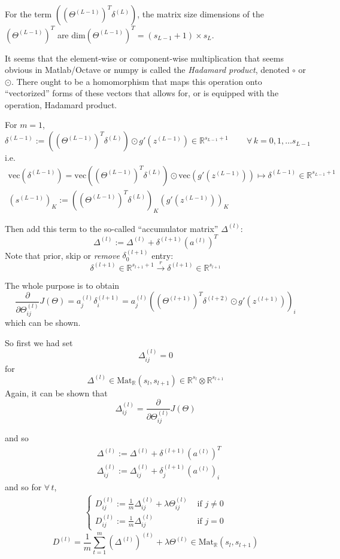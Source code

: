 \documentclass[10pt]{amsart}
\begin{document}
\begin{multicols*}{2}
For the term $((\Theta^{(L-1)})^T \delta^{(L)} )$, the matrix size dimensions of the $(\Theta^{(L-1)})^T$ are $\text{dim}( \Theta^{(L-1)} )^T = (s_{L-1}  + 1) \times s_L$.

It seems that the element-wise or component-wise multiplication that seems obvious in Matlab/Octave or numpy is called the \emph{Hadamard product}, denoted $\circ$ or $\odot$.  There ought to be a homomorphism that maps this operation onto ``vectorized'' forms of these vectors that allows for, or is equipped with the operation, Hadamard product.

For $m=1$,
\[
\delta^{(L-1)} := \left( ( \Theta^{(L-1)})^T \delta^{(L)} \right) \odot g'(z^{(L-1)}) \in \mathbb{R}^{s_{L-1} + 1} \qquad \, \forall \, k = 0 , 1, \dots s_{L-1}
\]
i.e.
\[
\begin{gathered}
  \text{vec}(\delta^{(L-1)} ) = \text{vec} ((\Theta^{(L-1)})^T \delta^{(L)} ) \odot \text{vec}( g'(z^{(L-1)}) ) \mapsto \delta^{(L-1)} \in \mathbb{R}^{s_{L-1} + 1} \\ 
 (s^{(L-1)} )_K := ((\Theta^{(L-1)})^T \delta^{(L)} )_K (g'(z^{(L-1)} ) )_K
\end{gathered}
\]

Then add this term to the so-called ``accumulator matrix'' $\Delta^{(l)}$:
\[
\Delta^{(l)} := \Delta^{(l)} + \delta^{(l+1)} (a^{(l)})^T
\]
Note that prior, skip or \emph{remove} $\delta_0^{(l+1)}$ entry:
\[
\delta^{(l+1)} \in \mathbb{R}^{ s_{l+1} + 1} \xrightarrow{ r} \delta^{(l+1)} \in \mathbb{R}^{s_{l+1} }
\]

The whole purpose is to obtain
\[
\frac{ \partial }{ \partial \Theta^{(l)}_{ij} } J(\Theta) = a_j^{(l)} \delta_i^{(l+1)} = a_j^{(l)} ( (\Theta^{(l+1)})^T \delta^{(l+2)} \odot g'(z^{(l+1)}) )_i  
\]
which can be shown.

So first we had set
\[
\Delta_{ij}^{(l)} = 0 
\]
for
\[
\Delta^{(l)} \in \text{Mat}_{\mathbb{R}}(s_l, s_{l+1} ) \in \mathbb{R}^{s_l} \otimes \mathbb{R}^{s_{l+1}} 
\]
Again, it can be shown that 
\begin{equation}
  \Delta_{ij}^{(l)} = \frac{ \partial }{ \partial \Theta^{(l)}_{ij} } J(\Theta)
  \end{equation}

and so
\[
\begin{aligned}
 & \Delta^{(l)} := \Delta^{(l)} + \delta^{(l+1)} (a^{(l)})^T \\ 
 & \Delta^{(l)}_{ij} := \Delta^{(l)}_{ij} + \delta^{(l+1)}_j (a^{(l)})_i 
\end{aligned}
\]
and so for $\forall \, t$,
\[
\begin{aligned}
\begin{cases}   D_{ij}^{(l)} := \frac{1}{m} \Delta_{ij}^{(l)} + \lambda \Theta_{ij}^{(l)} & \text{ if } j \neq 0 \\
  D_{ij}^{(l)} := \frac{1}{m} \Delta_{ij}^{(l)} & \text{ if } j = 0 \end{cases}
  \end{aligned}
\]
\[
D^{(l)} = \frac{1}{m} \sum_{t=1}^m (\Delta^{(l)})^{(t)} + \lambda \Theta^{(l)} \in \text{Mat}_{\mathbb{R}}(s_l,s_{l+1})
\]



\end{multicols*}
\end{document}
